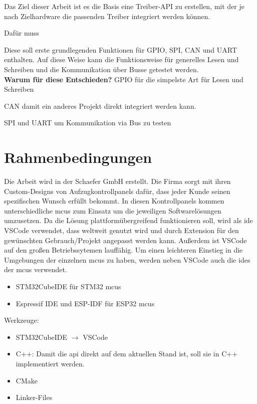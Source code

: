 Das Ziel dieser Arbeit ist es die Basis eine Treiber-API zu erstellen, mit der je nach Zielhardware die passenden Treiber integriert werden können.

Dafür muss 

Diese soll erste grundlegenden Funktionen für GPIO, SPI, CAN und UART enthalten. 
Auf diese Weise kann die Funktionsweise für generelles Lesen und Schreiben und die Kommunikation über Busse getestet werden.
\\

\textbf{Warum für diese Entschieden?}
GPIO für die simpelste Art für Lesen und Schreiben

CAN damit ein anderes Projekt direkt integriert werden kann.


SPI und UART um Kommunikation via Bus zu testen




\section{Rahmenbedingungen}
Die Arbeit wird in der Schaefer GmbH erstellt. 
Die Firma sorgt mit ihren Custom-Designs von Aufzugkontrollpanels dafür, dass jeder Kunde seinen spezifischen Wunsch erfüllt bekommt.
In diesen Kontrollpanels kommen unterschiedliche \gls{mcu}s zum Einsatz um die jeweiligen Softwarelösungen umzusetzen.
Da die Lösung plattformübergreifend funktionieren soll, wird als \gls{ide} VSCode verwendet, dass weltweit genutzt wird und durch Extension für den gewünschten Gebrauch/Projekt angepasst werden kann. 
Außerdem ist VSCode auf den großen Betriebssytemen lauffähig.
Um einen leichteren Einstieg in die Umgebungen der einzelnen \gls{mcu}s zu haben, werden neben VSCode auch die \gls{ide}s der \gls{mcu}s verwendet.
\begin{itemize}
	\item STM32CubeIDE für STM32 \gls{mcu}s
	\item Espressif IDE und ESP-IDF für ESP32 \gls{mcu}s
\end{itemize}

Werkzeuge:
\begin{itemize}
	\item STM32CubeIDE $\rightarrow$ VSCode
	\item C++: Damit die \gls{api} direkt auf dem aktuellen Stand ist, soll sie in C++ implementiert werden.
	\item CMake
	\item Linker-Files
\end{itemize}

